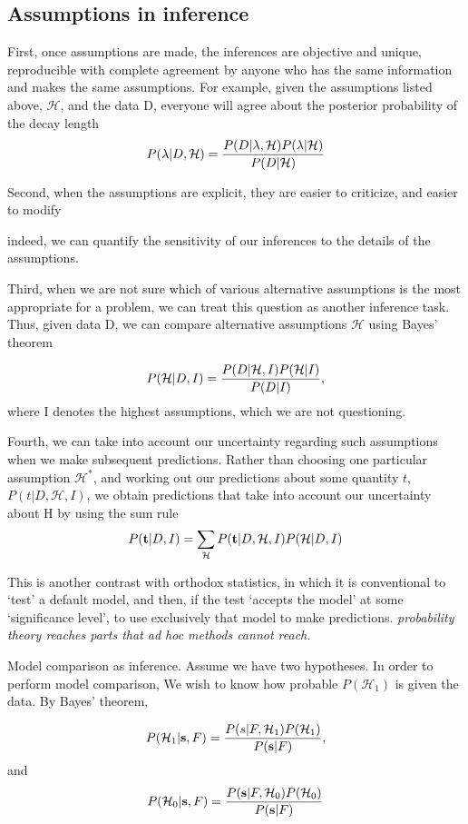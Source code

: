 \documentclass[a4paper,11pt]{article}
\numberwithin{equation}{section}
\begin{document}
\subsection{Assumptions in inference}

First, once assumptions are made, the inferences are objective and unique,
reproducible with complete agreement by anyone who has the same information
and makes the same assumptions. For example, given the assumptions
listed above, $\mathcal{H}$, and the data D, everyone will agree about the posterior probability
of the decay length
$$
P(\lambda | D, \mathcal{H})= {P(D|\lambda , \mathcal{H})P(\lambda |  \mathcal{H}) \over P(D|\mathcal{H})}
$$

Second, when the assumptions are explicit, they are easier to criticize, and
easier to modify { indeed, we can quantify the sensitivity of our inferences to
the details of the assumptions.



Third, when we are not sure which of various alternative assumptions is
the most appropriate for a problem, we can treat this question as another
inference task. Thus, given data D, we can compare alternative assumptions
$\mathcal{H}$ using Bayes' theorem

$$
P( \mathcal{H}|D,I)= {P(D| \mathcal{H},I)P(\mathcal{H}|I) \over P(D|I)},
$$
where I denotes the highest assumptions, which we are not questioning.

Fourth, we can take into account our uncertainty regarding such assumptions
when we make subsequent predictions. Rather than choosing one particular
assumption $\mathcal{H}^*$, and working out our predictions about some quantity $t$,
$P(t |D, \mathcal{H},I)$, we obtain predictions that take into account our uncertainty 
about H by using the sum rule
$$
P({\textbf t} | D, I)= \sum_{\mathcal{H}} P({\textbf t}|D, \mathcal{H},I)P( \mathcal{H}|D,I) 
$$

This is another contrast with orthodox statistics, in which it is conventional
to `test' a default model, and then, if the test `accepts the model' at some
`significance level', to use exclusively that model to make predictions.
{\it probability theory reaches parts that ad hoc methods cannot reach.}



Model comparison as inference. Assume we have two hypotheses. In order to perform model comparison, We wish to
know how probable $P(\mathcal{H}_1)$ is given the data. By Bayes' theorem,

$$
P( \mathcal{H}_1|{\textbf s},F)= {P(s|F, \mathcal{H}_1)P(\mathcal{H}_1) \over P({\textbf s}|F)},
$$
and 
$$ 
P( \mathcal{H}_0|{\textbf s},F)= {P({\textbf s}|F, \mathcal{H}_0)P(\mathcal{H}_0) \over P({\textbf s}|F)}
$$

}
\end{document}
